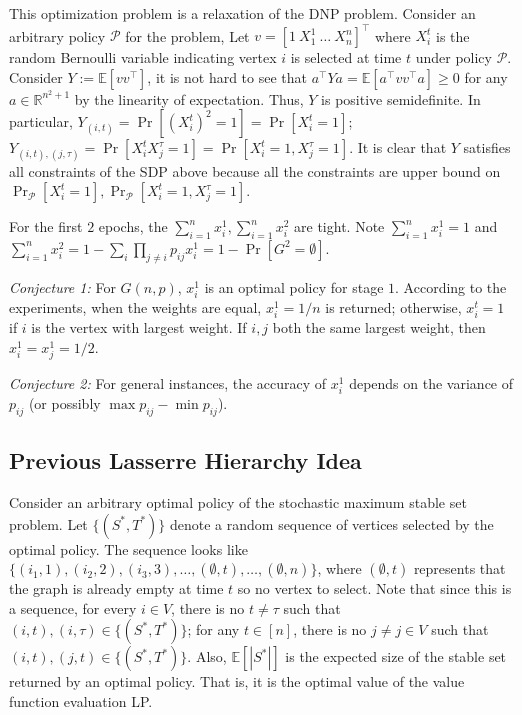 \documentclass[10pt,leqno]{amsart}
\newcommand{\R}{\mathbb{R}}
\newcommand{\E}{\mathbb{E}}
\begin{document}
This optimization problem is a relaxation of the DNP problem.
Consider an arbitrary policy $\mathcal{P}$ for the problem,
Let $v = [1~X_1^1~\ldots~X_n^n]^\top$ where $X_i^t$ is the random Bernoulli variable indicating vertex $i$ is selected at time $t$ under policy $\mathcal{P}$.
Consider $Y:=\E[vv^\top]$, it is not hard to see that $a^\top Ya=\E[a^\top vv^\top a]\geq 0$ for any $a\in\R^{n^2+1}$ 
by the linearity of expectation.
Thus, $Y$ is positive semidefinite.
In particular, $Y_{(i,t)}=\Pr[(X_i^t)^2 = 1]=\Pr[X_i^t = 1]$;
$Y_{(i,t),(j,\tau)} = \Pr[X_i^tX_j^\tau = 1] = \Pr[X_i^t = 1, X_j^\tau = 1]$.
It is clear that $Y$ satisfies all constraints of the SDP above because all the constraints are upper bound on 
$\Pr_{\mathcal{P}}[X_i^t=1], \Pr_{\mathcal{P}}[X_i^t=1,X_j^\tau =1]$.

For the first $2$ epochs, the $\sum_{i=1}^{n}x_i^1,\sum_{i=1}^{n}x_i^2$ are tight. 
Note $\sum_{i=1}^{n}x_i^1 = 1$ and $\sum_{i=1}^{n}x_i^2 = 1-\sum_{i}\prod_{j\neq i}p_{ij} x_i^1 = 1 - \Pr[G^2=\emptyset].$

\emph{Conjecture 1:} For $G(n,p)$, $x_i^1$ is an optimal policy for stage $1$. According to the experiments, when the weights are equal, $x_i^1 = 1/n$ is returned; otherwise, $x_i^t = 1$ if $i$ is the vertex with largest weight.
If $i,j$ both the same largest weight, then $x_i^1 = x_j^1 = 1/2$.

\emph{Conjecture 2:} For general instances, the accuracy of $x_i^1$ depends on the variance of $p_{ij}$ (or possibly $\max p_{ij} - \min p_{ij}$).
\subsection{Previous Lasserre Hierarchy Idea}
Consider an arbitrary optimal policy of the stochastic maximum stable set problem.
Let $\{(S^*,T^*)\}$ denote a random sequence of vertices selected by the optimal policy.
The sequence looks like $\{(i_1,1),(i_2,2),(i_3,3),\ldots, (\emptyset, t),\ldots,(\emptyset,n)\}$, where $(\emptyset,t)$ represents that the graph is already empty at time $t$ so no vertex to select.
Note that since this is a sequence, for every $i\in V$, there is no $t\neq \tau$ such that $(i,t),(i,\tau)\in \{(S^*,T^*)\}$; for any $t\in[n]$, there is no $j\neq j\in V$ such that $(i,t),(j,t)\in\{(S^*,T^*)\}$.
Also, $\E[|S^*|]$ is the expected size of the stable set returned by an optimal policy. That is, it is the optimal value of the value function evaluation LP.
\end{document}
